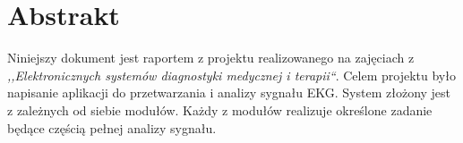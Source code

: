 \section{Abstrakt}
Niniejszy dokument jest raportem z projektu realizowanego na zajęciach z \emph{,,Elektronicznych systemów diagnostyki medycznej i terapii``}. Celem projektu było napisanie aplikacji do przetwarzania i analizy sygnału EKG. System złożony jest z zależnych od siebie modułów. Każdy z modułów realizuje określone zadanie będące częścią pełnej analizy sygnału.
